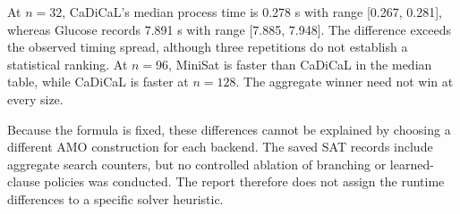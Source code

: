 At $n=32$, CaDiCaL's median process time is 0.278 s with range [0.267, 0.281], whereas Glucose records 7.891 s with range [7.885, 7.948]. The difference exceeds the observed timing spread, although three repetitions do not establish a statistical ranking. At $n=96$, MiniSat is faster than CaDiCaL in the median table, while CaDiCaL is faster at $n=128$. The aggregate winner need not win at every size.

Because the formula is fixed, these differences cannot be explained by choosing a different AMO construction for each backend. The saved SAT records include aggregate search counters, but no controlled ablation of branching or learned-clause policies was conducted. The report therefore does not assign the runtime differences to a specific solver heuristic.
